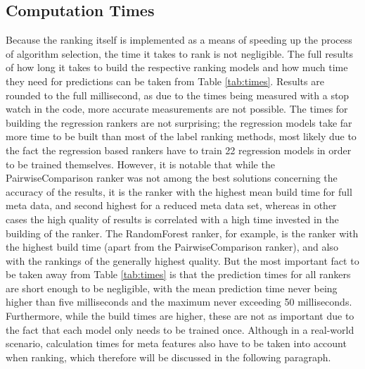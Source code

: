 \subsection{Computation Times}

Because the ranking itself is implemented as a means of speeding up the process of algorithm selection, the time it takes to rank is not negligible. The full results of how long it takes to build the respective ranking models and how much time they need for predictions can be taken from Table \ref{tab:times}. Results are rounded to the full millisecond, as due to the times being measured with a stop watch in the code, more accurate measurements are not possible. The times for building the regression rankers are not surprising; the regression models take far more time to be built than most of the label ranking methods, most likely due to the fact the regression based rankers have to train 22 regression models in order to be trained themselves. However, it is notable that while the PairwiseComparison ranker was not among the best solutions concerning the accuracy of the results, it is the ranker with the highest mean build time for full meta data, and second highest for a reduced meta data set, whereas in other cases the high quality of results is correlated with a high time invested in the building of the ranker. The RandomForest ranker, for example, is the ranker with the highest build time (apart from the PairwiseComparison ranker), and also with the rankings of the generally highest quality. But the most important fact to be taken away from Table \ref{tab:times} is that the prediction times for all rankers are short enough to be negligible, with the mean prediction time never being higher than five milliseconds and the maximum never exceeding 50 milliseconds. Furthermore, while the build times are higher, these are not as important due to the fact that each model only needs to be trained once. Although in a real-world scenario, calculation times for meta features also have to be taken into account when ranking, which therefore will be discussed in the following paragraph.



